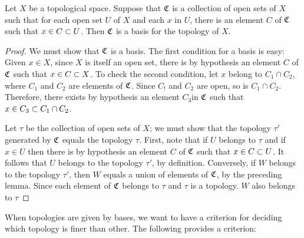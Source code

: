 \begin{lem}
	Let $X$ be a topological space. Suppose that $\mathfrak{C}$ is a collection of open sets of $X$ such that for each open set $U$ of $X$ and each $x $ in $U$, there is an element $C$ of $ \mathfrak{C} $ such that $ x \in C \subset U$. Then $ \mathfrak{C} $ is a basis for the topology of $X$.
\end{lem}

\begin{proof}
	We must show that $ \mathfrak{C} $ is a basis. The first condition for a basis is easy: Given $x \in X$, since $X$ is itself an open set, there is by hypothesis an element $C$ of $ \mathfrak{C} $ such that $ x \in C \subset X$. To check the second condition, let $x$ belong to $ C_1 \cap C_2$, where $C_1$ and $C_2$ are elements of $ \mathfrak{C} $. Since $C_! $ and $C_2$ are open, so is $ C_1 \cap C_2$. Therefore, there exists by hypothesis an element $C_3$in $ \mathfrak{C } $ such that $x \in C_3 \subset C_1 \cap C_2$.
	
	Let $ \tau $ be the collection of open sets of $X$; we must show that the topology $ \tau'$ generated by $ \mathfrak{C} $ equals the topology $ \tau $. First, note that if $U$ belongs to $\tau $ and if $ x \in U$ then there is by hypothesis an element $C$ of $ \mathfrak{C} $ such that $x \in C \subset U$. It follows that $U$ belongs to the topology $ \tau'$, by definition. Conversely, if $W$ belongs to the topology $ \tau'$, then $W$ equals a union of elements of $ \mathfrak{C} $, by the preceding lemma. Since each element of $\mathfrak{C}$ belongs to $ \tau $ and $ \tau $ is a topology. $W$ also belongs to $ \tau $	
\end{proof}

When topologies are given by bases, we want to have a criterion for deciding which topology is finer than other. The following provides a criterion:

